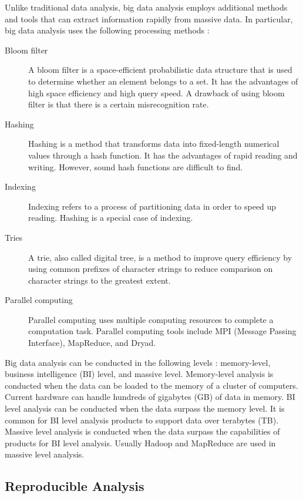 \documentclass[12pt]{article}
\begin{document}
Unlike traditional data analysis, big data analysis employs additional methods and tools that can extract information rapidly from massive data. In particular, big data analysis uses the following processing methods \citep{chen2014b}:
\begin{description}
\item[Bloom filter] A bloom filter is a space-efficient probabilistic data structure that is used to determine whether an element belongs to a set. It has the advantages of high space efficiency and high query speed. A drawback of using bloom filter is that there is a certain misrecognition rate.
\item[Hashing] Hashing is a method that transforms data into  fixed-length numerical values through a hash function. It has the advantages of rapid reading and writing. However, sound hash functions are difficult to find. 
\item[Indexing] Indexing refers to a process of partitioning data in order to speed up reading. Hashing is a special case of indexing.
\item[Tries] A trie,  also called digital tree, is a method to improve query efficiency by using common prefixes of character strings to reduce comparison on character strings to the greatest extent.
\item[Parallel computing] Parallel computing uses multiple computing resources to complete a computation task. Parallel computing tools include MPI (Message Passing Interface), MapReduce, and Dryad.
\end{description}

Big data analysis can be conducted in the following levels \citep{chen2014b}: memory-level, business intelligence (BI) level, and massive level. Memory-level analysis is conducted when the data can be loaded to the memory of a cluster of computers. Current hardware can handle hundreds of gigabytes (GB) of data in memory. BI level analysis can be conducted when the data surpass the memory level. It is common for BI level analysis products to support data over terabytes (TB). Massive level analysis is conducted when the data surpass the capabilities of products for BI level analysis. Usually Hadoop and MapReduce are used in massive level analysis. 

\subsection{Reproducible Analysis}
\end{document}
